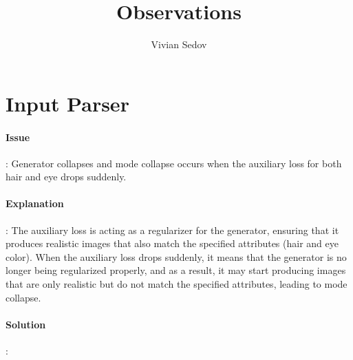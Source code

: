 \documentclass{article}
\title{Observations}
\author{Vivian Sedov}
\theoremstyle{mytheoremstyle}
\theoremstyle{mytheoremstyle}
\theoremstyle{myproblemstyle}
\begin{document}
    \maketitle
    \tableofcontents

    \section{Input Parser}
    \paragraph{Issue}: Generator collapses and mode collapse occurs when the auxiliary loss for both hair and eye drops suddenly.

    \paragraph{Explanation}: The auxiliary loss is acting as a regularizer for the generator, ensuring that it produces realistic images that also match the specified attributes (hair and eye color). When the auxiliary loss drops suddenly, it means that the generator is no longer being regularized properly, and as a result, it may start producing images that are only realistic but do not match the specified attributes, leading to mode collapse.

    \paragraph{Solution}:
\end{document}
